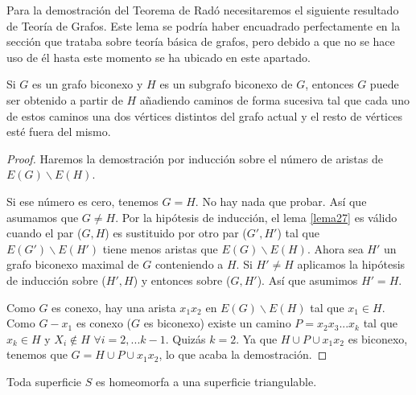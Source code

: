 Para la demostración del Teorema de Radó necesitaremos el siguiente resultado de Teoría de Grafos.
Este lema se podría haber encuadrado perfectamente en la sección que trataba sobre teoría básica de grafos, pero debido a que no se hace uso de él hasta este momento se ha ubicado en este apartado.

\begin{lemma}\label{lema27}
	Si $G$ es un grafo biconexo y $H$ es un subgrafo biconexo de $G$, entonces $G$ puede ser obtenido a partir de $H$ añadiendo caminos de forma sucesiva tal que cada uno de estos caminos una dos vértices distintos del grafo actual y el resto de vértices esté fuera del mismo.
\end{lemma}

\begin{proof}
	Haremos la demostración por inducción sobre el número de aristas de $E(G) \backslash E(H)$.

	Si ese número es cero, tenemos $G = H$. No hay nada que probar. Así que  asumamos que $G \neq H$. Por la hipótesis de inducción, el lema \ref{lema27} es válido cuando el par ($G,H$) es sustituido por otro par ($G',H'$) tal que $E(G') \backslash E(H')$ tiene menos aristas que $E(G) \backslash E(H)$. Ahora sea $H'$ un grafo biconexo maximal  de $G$ conteniendo a $H$. Si $H' \neq H$ aplicamos la hipótesis de inducción sobre ($H',H$) y entonces sobre ($G,H'$). Así que asumimos $H' = H$.

	Como $G$ es conexo, hay una arista $x_{1}x_{2}$ en $E(G) \backslash E(H)$ tal que $x_{1} \in H$. Como $G - x_{1}$ es conexo ($G$ es biconexo) existe un camino $P = x_{2}x_{3}...x_{k}$ tal que $x_{k} \in H$ y $X_i \notin H$ $\forall i = 2,... k-1$. Quizás $k = 2$. Ya que $H \cup P \cup {x_{1}x_{2}}$ es biconexo, tenemos que $G = H \cup P \cup {x_{1}x_{2}}$, lo que acaba la demostración.
\end{proof}

\begin{theorem}
	Toda superficie $S$ es homeomorfa a una superficie triangulable.
\end{theorem}

